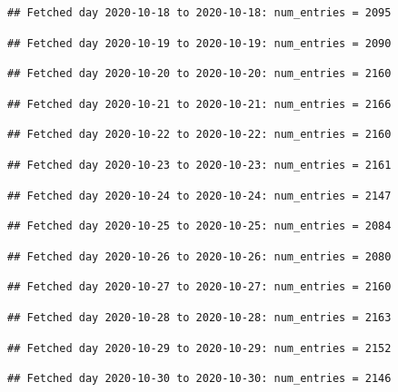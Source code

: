 \documentclass[]{article}
\begin{document}
\begin{verbatim}
## Fetched day 2020-10-18 to 2020-10-18: num_entries = 2095
\end{verbatim}

\begin{verbatim}
## Fetched day 2020-10-19 to 2020-10-19: num_entries = 2090
\end{verbatim}

\begin{verbatim}
## Fetched day 2020-10-20 to 2020-10-20: num_entries = 2160
\end{verbatim}

\begin{verbatim}
## Fetched day 2020-10-21 to 2020-10-21: num_entries = 2166
\end{verbatim}

\begin{verbatim}
## Fetched day 2020-10-22 to 2020-10-22: num_entries = 2160
\end{verbatim}

\begin{verbatim}
## Fetched day 2020-10-23 to 2020-10-23: num_entries = 2161
\end{verbatim}

\begin{verbatim}
## Fetched day 2020-10-24 to 2020-10-24: num_entries = 2147
\end{verbatim}

\begin{verbatim}
## Fetched day 2020-10-25 to 2020-10-25: num_entries = 2084
\end{verbatim}

\begin{verbatim}
## Fetched day 2020-10-26 to 2020-10-26: num_entries = 2080
\end{verbatim}

\begin{verbatim}
## Fetched day 2020-10-27 to 2020-10-27: num_entries = 2160
\end{verbatim}

\begin{verbatim}
## Fetched day 2020-10-28 to 2020-10-28: num_entries = 2163
\end{verbatim}

\begin{verbatim}
## Fetched day 2020-10-29 to 2020-10-29: num_entries = 2152
\end{verbatim}

\begin{verbatim}
## Fetched day 2020-10-30 to 2020-10-30: num_entries = 2146
\end{verbatim}
\end{document}
